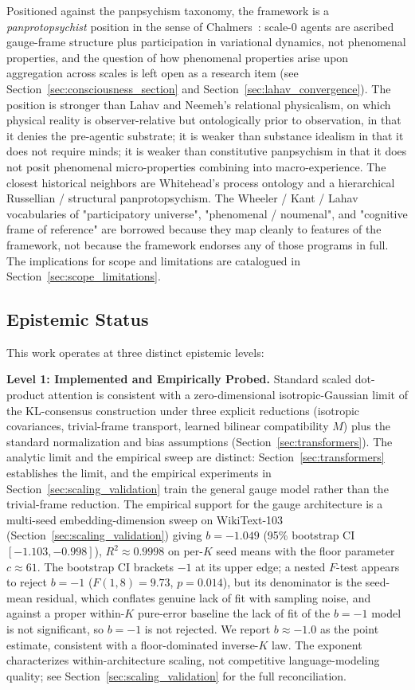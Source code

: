 \documentclass[11pt]{article}
\begin{document}
Positioned against the panpsychism taxonomy, the framework is a \emph{panprotopsychist} position in the sense of Chalmers~\cite{Chalmers2013consciousness, Chalmers2016}: scale-0 agents are ascribed gauge-frame structure plus participation in variational dynamics, not phenomenal properties, and the question of how phenomenal properties arise upon aggregation across scales is left open as a research item (see Section~\ref{sec:consciousness_section} and Section~\ref{sec:lahav_convergence}). The position is stronger than Lahav and Neemeh's relational physicalism, on which physical reality is observer-relative but ontologically prior to observation, in that it denies the pre-agentic substrate; it is weaker than substance idealism in that it does not require minds; it is weaker than constitutive panpsychism in that it does not posit phenomenal micro-properties combining into macro-experience. The closest historical neighbors are Whitehead's process ontology and a hierarchical Russellian / structural panprotopsychism. The Wheeler / Kant / Lahav vocabularies of "participatory universe", "phenomenal / noumenal", and "cognitive frame of reference" are borrowed because they map cleanly to features of the framework, not because the framework endorses any of those programs in full. The implications for scope and limitations are catalogued in Section~\ref{sec:scope_limitations}.

\subsection{Epistemic Status}

This work operates at three distinct epistemic levels:

\textbf{Level 1: Implemented and Empirically Probed.} Standard scaled dot-product attention is consistent with a zero-dimensional isotropic-Gaussian limit of the KL-consensus construction under three explicit reductions (isotropic covariances, trivial-frame transport, learned bilinear compatibility $M$) plus the standard normalization and bias assumptions (Section~\ref{sec:transformers}). The analytic limit and the empirical sweep are distinct: Section~\ref{sec:transformers} establishes the limit, and the empirical experiments in Section~\ref{sec:scaling_validation} train the general gauge model rather than the trivial-frame reduction. The empirical support for the gauge architecture is a multi-seed embedding-dimension sweep on WikiText-103 (Section~\ref{sec:scaling_validation}) giving $b = -1.049$ (95\% bootstrap CI $[-1.103, -0.998]$), $R^2 \approx 0.9998$ on per-$K$ seed means with the floor parameter $c \approx 61$. The bootstrap CI brackets $-1$ at its upper edge; a nested $F$-test appears to reject $b = -1$ ($F(1,8) = 9.73$, $p = 0.014$), but its denominator is the seed-mean residual, which conflates genuine lack of fit with sampling noise, and against a proper within-$K$ pure-error baseline the lack of fit of the $b = -1$ model is not significant, so $b = -1$ is not rejected. We report $b \approx -1.0$ as the point estimate, consistent with a floor-dominated inverse-$K$ law. The exponent characterizes within-architecture scaling, not competitive language-modeling quality; see Section~\ref{sec:scaling_validation} for the full reconciliation.
\end{document}
